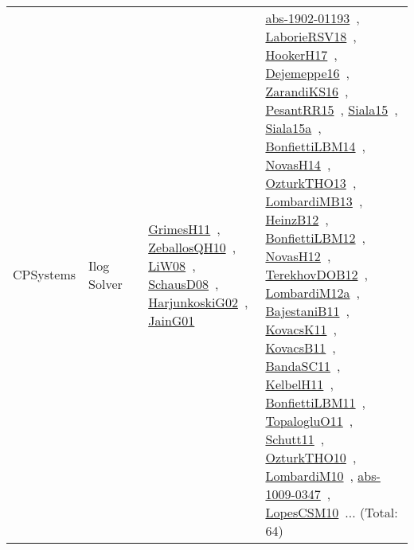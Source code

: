 {\begin{longtable}{lp{3cm}>{\raggedright\arraybackslash}p{6cm}>{\raggedright\arraybackslash}p{6cm}>{\raggedright\arraybackslash}p{8cm}}
CPSystems & Ilog Solver &  & \href{../works/GrimesH11.pdf}{GrimesH11}~\cite{GrimesH11}, \href{../works/ZeballosQH10.pdf}{ZeballosQH10}~\cite{ZeballosQH10}, \href{../works/LiW08.pdf}{LiW08}~\cite{LiW08}, \href{../works/SchausD08.pdf}{SchausD08}~\cite{SchausD08}, \href{../works/HarjunkoskiG02.pdf}{HarjunkoskiG02}~\cite{HarjunkoskiG02}, \href{../works/JainG01.pdf}{JainG01}~\cite{JainG01} & \href{../works/abs-1902-01193.pdf}{abs-1902-01193}~\cite{abs-1902-01193}, \href{../works/LaborieRSV18.pdf}{LaborieRSV18}~\cite{LaborieRSV18}, \href{../works/HookerH17.pdf}{HookerH17}~\cite{HookerH17}, \href{../works/Dejemeppe16.pdf}{Dejemeppe16}~\cite{Dejemeppe16}, \href{../works/ZarandiKS16.pdf}{ZarandiKS16}~\cite{ZarandiKS16}, \href{../works/PesantRR15.pdf}{PesantRR15}~\cite{PesantRR15}, \href{../works/Siala15.pdf}{Siala15}~\cite{Siala15}, \href{../works/Siala15a.pdf}{Siala15a}~\cite{Siala15a}, \href{../works/BonfiettiLBM14.pdf}{BonfiettiLBM14}~\cite{BonfiettiLBM14}, \href{../works/NovasH14.pdf}{NovasH14}~\cite{NovasH14}, \href{../works/OzturkTHO13.pdf}{OzturkTHO13}~\cite{OzturkTHO13}, \href{../works/LombardiMB13.pdf}{LombardiMB13}~\cite{LombardiMB13}, \href{../works/HeinzB12.pdf}{HeinzB12}~\cite{HeinzB12}, \href{../works/BonfiettiLBM12.pdf}{BonfiettiLBM12}~\cite{BonfiettiLBM12}, \href{../works/NovasH12.pdf}{NovasH12}~\cite{NovasH12}, \href{../works/TerekhovDOB12.pdf}{TerekhovDOB12}~\cite{TerekhovDOB12}, \href{../works/LombardiM12a.pdf}{LombardiM12a}~\cite{LombardiM12a}, \href{../works/BajestaniB11.pdf}{BajestaniB11}~\cite{BajestaniB11}, \href{../works/KovacsK11.pdf}{KovacsK11}~\cite{KovacsK11}, \href{../works/KovacsB11.pdf}{KovacsB11}~\cite{KovacsB11}, \href{../works/BandaSC11.pdf}{BandaSC11}~\cite{BandaSC11}, \href{../works/KelbelH11.pdf}{KelbelH11}~\cite{KelbelH11}, \href{../works/BonfiettiLBM11.pdf}{BonfiettiLBM11}~\cite{BonfiettiLBM11}, \href{../works/TopalogluO11.pdf}{TopalogluO11}~\cite{TopalogluO11}, \href{../works/Schutt11.pdf}{Schutt11}~\cite{Schutt11}, \href{../works/OzturkTHO10.pdf}{OzturkTHO10}~\cite{OzturkTHO10}, \href{../works/LombardiM10.pdf}{LombardiM10}~\cite{LombardiM10}, \href{../works/abs-1009-0347.pdf}{abs-1009-0347}~\cite{abs-1009-0347}, \href{../works/LopesCSM10.pdf}{LopesCSM10}~\cite{LopesCSM10}... (Total: 64)\\

\end{longtable}}
